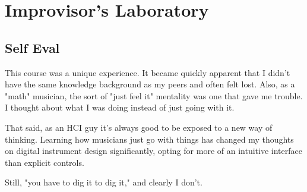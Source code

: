 \section{Improvisor's Laboratory}

\begin{meta}
\end{meta}

\subsection*{Self Eval}
This course was a unique experience. It became quickly apparent that I
didn't have the same knowledge background as my peers and often felt
lost. Also, as a "math" musician, the sort of "just feel it" mentality
was one that gave me trouble. I thought about what I was doing instead
of just going with it.

That said, as an HCI guy it's always good to be exposed to a new way
of thinking. Learning how musicians just go with things has changed my
thoughts on digital instrument design significantly, opting for more of
an intuitive interface than explicit controls.

Still, "you have to dig it to dig it," and clearly I don't.

